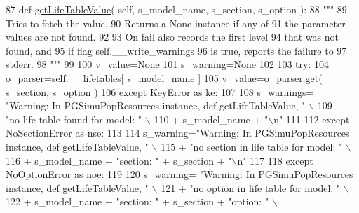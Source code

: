 \begin{DoxyCode}
87     \textcolor{keyword}{def }\hyperlink{classnegui_1_1pgsimupopresources_1_1PGSimuPopResources_a37fa2c7b4da84a2281231943a8e61c6c}{getLifeTableValue}( self, s\_model\_name, s\_section, s\_option ):
88         \textcolor{stringliteral}{"""}
89 \textcolor{stringliteral}{        Tries to fetch the value, }
90 \textcolor{stringliteral}{        Returns a None instance if any of }
91 \textcolor{stringliteral}{        the parameter values are not found.}
92 \textcolor{stringliteral}{}
93 \textcolor{stringliteral}{        On fail also records the first level}
94 \textcolor{stringliteral}{        that was not found, and}
95 \textcolor{stringliteral}{        if flag self.\_\_write\_warnings}
96 \textcolor{stringliteral}{        is true, reports the failure to}
97 \textcolor{stringliteral}{        stderr.}
98 \textcolor{stringliteral}{        """}
99 
100         v\_value=\textcolor{keywordtype}{None}
101         s\_warning=\textcolor{keywordtype}{None}
102 
103         \textcolor{keywordflow}{try}:
104             o\_parser=self.\hyperlink{classnegui_1_1pgsimupopresources_1_1PGSimuPopResources_ae32ca7cc4b6a1563734a82da0a0c6608}{\_\_lifetables}[ s\_model\_name ]
105             v\_value=o\_parser.get( s\_section, s\_option )
106         \textcolor{keywordflow}{except} KeyError \textcolor{keyword}{as} ke:
107 
108             s\_warnings= \textcolor{stringliteral}{"Warning: In PGSimuPopResources instance, def getLifeTableValue, "} \(\backslash\)
109                     + \textcolor{stringliteral}{"no life table found for model: "}  \(\backslash\)
110                     + s\_model\_name + \textcolor{stringliteral}{"\(\backslash\)n"} 
111 
112         \textcolor{keywordflow}{except} NoSectionError \textcolor{keyword}{as} nse:
113 
114             s\_warning=\textcolor{stringliteral}{"Warning: In PGSimuPopResources instance, def getLifeTableValue, "} \(\backslash\)
115                     + \textcolor{stringliteral}{"no section in life table for model: "}  \(\backslash\)
116                     + s\_model\_name + \textcolor{stringliteral}{"section: "} + s\_section + \textcolor{stringliteral}{"\(\backslash\)n"} 
117 
118         \textcolor{keywordflow}{except} NoOptionError \textcolor{keyword}{as} noe:
119 
120             s\_warning= \textcolor{stringliteral}{"Warning: In PGSimuPopResources instance, def getLifeTableValue, "} \(\backslash\)
121                     + \textcolor{stringliteral}{"no option in life table for model: "}  \(\backslash\)
122                     + s\_model\_name + \textcolor{stringliteral}{"section: "} + s\_section + \textcolor{stringliteral}{"option: "} \(\backslash\)

\end{DoxyCode}
